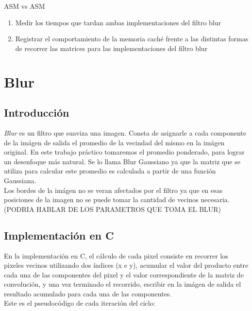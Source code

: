 \documentclass[10pt,a4paper,spanish]{article}
\begin{document}
ASM vs ASM

\begin{enumerate}
	\item Medir los tiempos que tardan ambas implementaciones del filtro blur
	\item Registrar el comportamiento de la memoria caché frente a las distintas formas de recorrer las matrices para las implementaciones del filtro blur
\end{enumerate}


\section{Blur}

\subsection{Introducción}

\textit{Blur} es un filtro que suaviza una imagen. Consta de asignarle a cada componente de la imágen de salida el promedio de la vecindad del mismo en la imágen original. En este trabajo práctico tomaremos el promedio ponderado, para lograr un desenfoque más natural. Se lo llama Blur Gaussiano ya que la matriz que se utiliza para calcular este promedio es calculada a partir de una función Gaussiana. \\

Los bordes de la imágen no se veran afectados por el filtro ya que en esas posiciones de la imagen no se puede tomar la cantidad de vecinos necesaria. \\

(PODRIA HABLAR DE LOS PARAMETROS QUE TOMA EL BLUR)

\subsection{Implementación en C}

En la implementación en C, el cálculo de cada pixel consiste en recorrer los pixeles vecinos utilizando dos índices (x e y), acumular el valor del producto entre cada una de las componentes del pixel y el valor correspondiente de la matriz de convolución, y una vez terminado el recorrido, escribir en la imágen de salida el resultado acumulado para cada una de las componentes. \\

Este es el pseudocódigo de cada iteración del ciclo:
\end{document}
